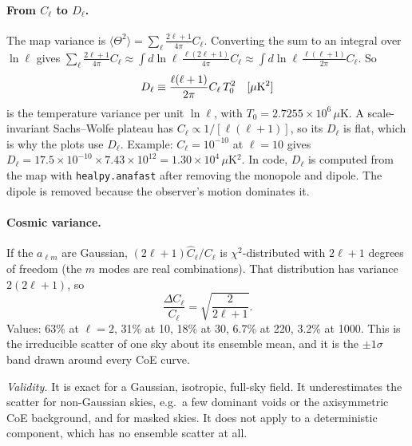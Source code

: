\documentclass[10pt,twocolumn]{article}
\newcommand{\why}[1]{\par\noindent\textit{Validity.} #1\par}
\begin{document}
\paragraph{From $C_\ell$ to $D_\ell$.} The map variance is $\langle\Theta^2\rangle=\sum_\ell\frac{2\ell+1}{4\pi}C_\ell$. Converting the sum to an integral over $\ln\ell$ gives $\sum_\ell\frac{2\ell+1}{4\pi}C_\ell\approx\int d\ln\ell\,\frac{\ell(2\ell+1)}{4\pi}C_\ell\approx\int d\ln\ell\,\frac{\ell(\ell+1)}{2\pi}C_\ell$. So
\begin{equation}
D_\ell\equiv\frac{\ell(\ell+1)}{2\pi}C_\ell\,T_0^2\quad[\mu{\rm K}^2]
\end{equation}
is the temperature variance per unit $\ln\ell$, with $T_0=2.7255\times10^6\,\mu$K. A scale-invariant Sachs--Wolfe plateau has $C_\ell\propto1/[\ell(\ell+1)]$, so its $D_\ell$ is flat, which is why the plots use $D_\ell$. Example: $C_\ell=10^{-10}$ at $\ell=10$ gives $D_\ell=17.5\times10^{-10}\times7.43\times10^{12}=1.30\times10^4\,\mu$K$^2$. In code, $D_\ell$ is computed from the map with \texttt{healpy.anafast} after removing the monopole and dipole. The dipole is removed because the observer's motion dominates it.

\paragraph{Cosmic variance.} If the $a_{\ell m}$ are Gaussian, $(2\ell+1)\hat C_\ell/C_\ell$ is $\chi^2$-distributed with $2\ell+1$ degrees of freedom (the $m$ modes are real combinations). That distribution has variance $2(2\ell+1)$, so
\begin{equation}
\frac{\Delta C_\ell}{C_\ell}=\sqrt{\frac{2}{2\ell+1}} .
\end{equation}
Values: 63\% at $\ell=2$, 31\% at 10, 18\% at 30, 6.7\% at 220, 3.2\% at 1000. This is the irreducible scatter of one sky about its ensemble mean, and it is the $\pm1\sigma$ band drawn around every CoE curve.
\why{It is exact for a Gaussian, isotropic, full-sky field. It underestimates the scatter for non-Gaussian skies, e.g.\ a few dominant voids or the axisymmetric CoE background, and for masked skies. It does not apply to a deterministic component, which has no ensemble scatter at all.}
\end{document}
